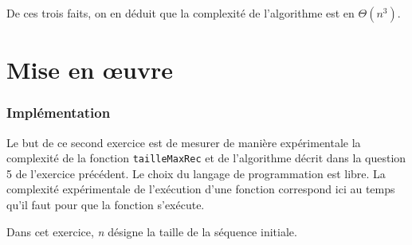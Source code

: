 \documentclass[12pt,a4paper]{article}
\begin{document}
De ces trois faits, on en d\'eduit que la complexit\'e de l'algorithme est en $\Theta(n^3)$.

\lstset{language=Python,inputencoding=utf8/latin1}

\lstset{escapechar=@,style=custompy}
\newpage
\part{Mise en \oe uvre}

\section{Impl\'ementation}
Le but de ce second exercice est de mesurer de mani\`ere exp\'erimentale la complexit\'e de la fonction \texttt{tailleMaxRec} et de l'algorithme d\'ecrit dans la question 5 de l'exercice pr\'ec\'edent. Le choix du langage de programmation est libre. La complexit\'e exp\'erimentale de l'ex\'ecution d'une fonction correspond ici au temps qu'il faut pour que la fonction s'ex\'ecute.

Dans cet exercice, {\itshape n} d\'esigne la taille de la s\'equence initiale.
\end{document}
